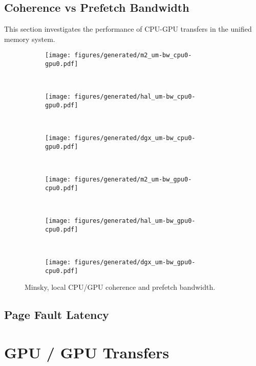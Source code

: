 \subsection{Coherence vs Prefetch Bandwidth}
This section investigates the performance of CPU-GPU transfers in the unified memory system.

\begin{figure}[ht]
    \centering
    \begin{subfigure}[b]{0.31\textwidth}
        \texttt{[image: figures/generated/m2\_um-bw\_cpu0-gpu0.pdf]}
        \caption{}
        \label{}
    \end{subfigure}
    ~
    \begin{subfigure}[b]{0.31\textwidth}
        \texttt{[image: figures/generated/hal\_um-bw\_cpu0-gpu0.pdf]}
        \caption{}
        \label{}
    \end{subfigure}
    ~
    \begin{subfigure}[b]{0.31\textwidth}
        \texttt{[image: figures/generated/dgx\_um-bw\_cpu0-gpu0.pdf]}
        \caption{}
        \label{}
    \end{subfigure}
    \\
    \begin{subfigure}[b]{0.31\textwidth}
        \texttt{[image: figures/generated/m2\_um-bw\_gpu0-cpu0.pdf]}
        \caption{}
        \label{}
    \end{subfigure}
    ~
    \begin{subfigure}[b]{0.31\textwidth}
        \texttt{[image: figures/generated/hal\_um-bw\_gpu0-cpu0.pdf]}
        \caption{}
        \label{}
    \end{subfigure}
    ~
    \begin{subfigure}[b]{0.31\textwidth}
        \texttt{[image: figures/generated/dgx\_um-bw\_gpu0-cpu0.pdf]}
        \caption{}
        \label{}
    \end{subfigure}
    \caption[]{
        Minsky, local CPU/GPU coherence and prefetch bandwidth.
    }
    \label{}
\end{figure}

\subsection{Page Fault Latency}

\section{GPU / GPU Transfers}

